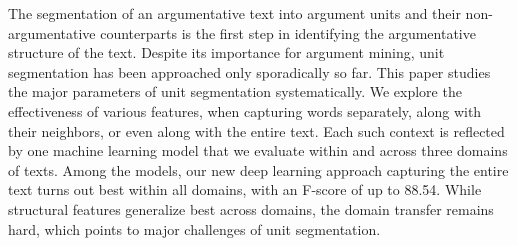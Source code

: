 The segmentation of an argumentative text into argument units and their non-argumentative counterparts is the first step in identifying the argumentative structure of the text. Despite its importance for argument mining, unit segmentation has been approached only sporadically so far. This paper studies the major parameters of unit segmentation systematically. We explore the effectiveness of various features, when capturing words separately, along with their neighbors, or even along with the entire text. Each such context is reflected by one machine learning model that we evaluate within and across three domains of texts. Among the models, our new deep learning approach capturing the entire text turns out best within all domains, with an F-score of up to 88.54. While structural features generalize best across domains, the domain transfer remains hard, which points to major challenges of unit segmentation.

